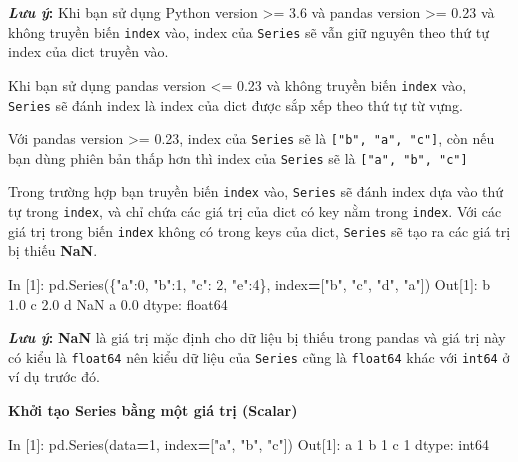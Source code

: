 \documentclass[
]{book}
\newenvironment{Shaded}{\begin{snugshade}}{\end{snugshade}}
\newcommand{\DecValTok}[1]{\textcolor[rgb]{0.00,0.00,0.81}{#1}}
\newcommand{\FloatTok}[1]{\textcolor[rgb]{0.00,0.00,0.81}{#1}}
\newcommand{\NormalTok}[1]{#1}
\newcommand{\OperatorTok}[1]{\textcolor[rgb]{0.81,0.36,0.00}{\textbf{#1}}}
\newcommand{\StringTok}[1]{\textcolor[rgb]{0.31,0.60,0.02}{#1}}
\begin{document}
\begin{rmdnote}
\textbf{\emph{Lưu ý}:}
Khi bạn sử dụng Python version \textgreater= 3.6 và pandas version \textgreater= 0.23 và không truyền biến \texttt{index} vào,
index của \texttt{Series} sẽ vẫn giữ nguyên theo thứ tự index của dict truyền vào.

Khi bạn sử dụng pandas version \textless= 0.23 và không truyền biến \texttt{index} vào, \texttt{Series} sẽ đánh index
là index của dict được sắp xếp theo thứ tự từ vựng.
\end{rmdnote}
Với pandas version \textgreater= 0.23, index của \texttt{Series} sẽ là \texttt{{[}"b",\ "a",\ "c"{]}}, còn nếu bạn dùng phiên bản
thấp hơn thì index của \texttt{Series} sẽ là \texttt{{[}"a",\ "b",\ "c"{]}}

Trong trường hợp bạn truyền biến \texttt{index} vào, \texttt{Series} sẽ đánh index dựa vào thứ tự trong \texttt{index}, và chỉ chứa các giá trị của dict có key nằm trong \texttt{index}.
Với các giá trị trong biến \texttt{index} không có trong keys của dict, \texttt{Series} sẽ tạo ra các giá trị
bị thiếu \textbf{NaN}.

\begin{Shaded}
\begin{Highlighting}[]
\NormalTok{In [}\DecValTok{1}\NormalTok{]: pd.Series(\{}\StringTok{"a"}\NormalTok{:}\DecValTok{0}\NormalTok{, }\StringTok{"b"}\NormalTok{:}\DecValTok{1}\NormalTok{, }\StringTok{"c"}\NormalTok{: }\DecValTok{2}\NormalTok{, }\StringTok{"e"}\NormalTok{:}\DecValTok{4}\NormalTok{\}, index}\OperatorTok{=}\NormalTok{[}\StringTok{"b"}\NormalTok{, }\StringTok{"c"}\NormalTok{, }\StringTok{"d"}\NormalTok{, }\StringTok{"a"}\NormalTok{])}
\NormalTok{Out[}\DecValTok{1}\NormalTok{]: }
\NormalTok{b    }\FloatTok{1.0}
\NormalTok{c    }\FloatTok{2.0}
\NormalTok{d    NaN}
\NormalTok{a    }\FloatTok{0.0}
\NormalTok{dtype: float64}
\end{Highlighting}
\end{Shaded}

\begin{rmdnote}
\textbf{\emph{Lưu ý}:} \textbf{NaN} là giá trị mặc định cho dữ liệu bị thiếu trong pandas và giá trị này có kiểu
là \texttt{float64} nên kiểu dữ liệu của \texttt{Series} cũng là \texttt{float64} khác với \texttt{int64} ở ví dụ trước đó.
\end{rmdnote}

\textbf{Khởi tạo Series bằng một giá trị (Scalar)}

\begin{Shaded}
\begin{Highlighting}[]
\NormalTok{In [}\DecValTok{1}\NormalTok{]: pd.Series(data}\OperatorTok{=}\DecValTok{1}\NormalTok{, index}\OperatorTok{=}\NormalTok{[}\StringTok{"a"}\NormalTok{, }\StringTok{"b"}\NormalTok{, }\StringTok{"c"}\NormalTok{])}
\NormalTok{Out[}\DecValTok{1}\NormalTok{]: }
\NormalTok{a    }\DecValTok{1}
\NormalTok{b    }\DecValTok{1}
\NormalTok{c    }\DecValTok{1}
\NormalTok{dtype: int64}
\end{Highlighting}
\end{Shaded}
\end{document}
